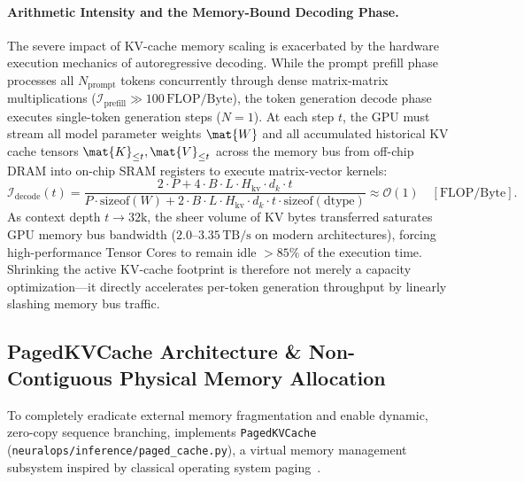 \paragraph{Arithmetic Intensity and the Memory-Bound Decoding Phase.}
The severe impact of KV-cache memory scaling is exacerbated by the hardware execution mechanics of autoregressive decoding. While the prompt prefill phase processes all $N_{\text{prompt}}$ tokens concurrently through dense matrix-matrix multiplications ($\mathcal{I}_{\text{prefill}} \gg 100\,\text{FLOP/Byte}$), the token generation decode phase executes single-token generation steps ($N=1$). At each step $t$, the GPU must stream all model parameter weights $\mat{W}$ and all accumulated historical KV cache tensors $\mat{K}_{\le t}, \mat{V}_{\le t}$ across the memory bus from off-chip DRAM into on-chip SRAM registers to execute matrix-vector kernels:
\begin{equation}
\mathcal{I}_{\text{decode}}(t) = \frac{2 \cdot P + 4 \cdot B \cdot L \cdot H_{\text{kv}} \cdot d_k \cdot t}{P \cdot \text{sizeof}(W) + 2 \cdot B \cdot L \cdot H_{\text{kv}} \cdot d_k \cdot t \cdot \text{sizeof}(\text{dtype})} \approx \mathcal{O}(1) \quad [\text{FLOP/Byte}].
\end{equation}
As context depth $t \to 32\text{k}$, the sheer volume of KV bytes transferred saturates GPU memory bus bandwidth ($2.0\text{--}3.35\,\text{TB/s}$ on modern architectures), forcing high-performance Tensor Cores to remain idle $>85\%$ of the execution time. Shrinking the active KV-cache footprint is therefore not merely a capacity optimization—it directly accelerates per-token generation throughput by linearly slashing memory bus traffic.

\subsection{PagedKVCache Architecture \& Non-Contiguous Physical Memory Allocation}
\label{sec:serving_paged_kv_cache}

To completely eradicate external memory fragmentation and enable dynamic, zero-copy sequence branching, \neuralops{} implements \texttt{PagedKVCache} (\texttt{neuralops/inference/paged\_cache.py}), a virtual memory management subsystem inspired by classical operating system paging~\cite{kwon2023vllm}.

